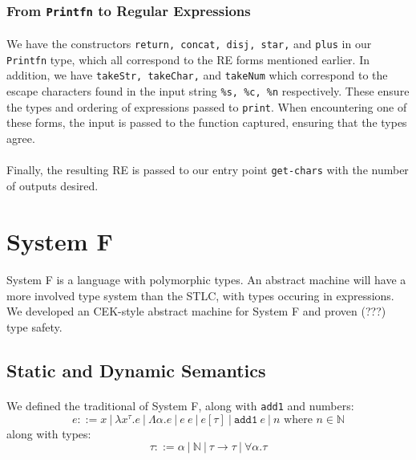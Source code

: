 \documentclass[12pt]{article}
\newcommand{\N}{\mathbb{N}}
\begin{document}
\subsubsection{From \texttt{Printfn} to Regular Expressions}
\paragraph{}
We have the constructors \texttt{return, concat, disj, star,} and \texttt{plus} in our \texttt{Printfn} type, which all correspond to the RE forms mentioned earlier. In addition, we have \texttt{takeStr, takeChar,} and \texttt{takeNum} which correspond to the escape characters found in the input string \texttt{\%s, \%c, \%n} respectively. These ensure the types and ordering of expressions passed to \texttt{print}. When encountering one of these forms, the input is passed to the function captured, ensuring that the types agree.
\paragraph{} Finally, the resulting RE is passed to our entry point \texttt{get-chars} with the number of outputs desired.


\section{System F}
\paragraph{} System F is a language with polymorphic types. An abstract machine will have a more involved type system than the STLC, with types occuring in expressions. We developed an CEK-style abstract machine for System F and proven (???) type safety.

\subsection{Static and Dynamic Semantics}
\paragraph{} We defined the traditional of System F, along with \texttt{add1} and numbers:
$$e ::= x \ | \ \lambda x^\tau . e \ | \ \Lambda \alpha . e \ | \ e \ e \ | \ e[\tau] \ | \ \texttt{add1} \ e \ | \ n \mbox{ where } n \in \N$$
along with types:
$$\tau ::= \alpha \ | \ \N \ | \ \tau \rightarrow \tau \ | \ \forall \alpha . \tau $$
\end{document}
